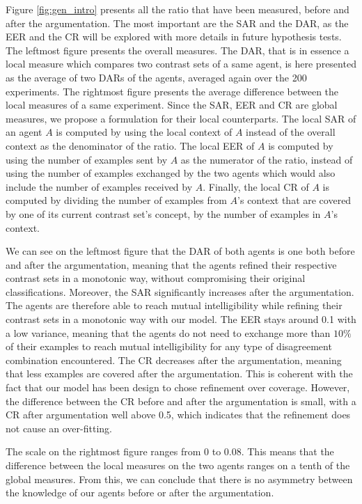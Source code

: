 Figure \ref{fig:gen_intro} presents all the ratio that have been measured, before and after the argumentation. The most important are the SAR and the DAR, as the EER and the CR will be explored with more details in  future hypothesis tests. The leftmost figure presents the overall measures. The DAR, that is in essence a local measure which compares two contrast sets of a same agent, is here presented as the average of two DARs of the agents, averaged again over the 200 experiments. The rightmost figure presents the average difference between the local measures of a same experiment. Since the SAR, EER and CR are global measures, we propose a formulation for their local counterparts. The local SAR of an agent $A$ is computed by using the local context of $A$ instead of the overall context as the denominator of the ratio. The local EER of $A$ is computed by using the number of examples sent by $A$ as the numerator of the ratio, instead of using the number of examples exchanged by the two agents which would also include the number of examples received by $A$. Finally, the local CR of $A$ is computed by dividing the number of examples from $A$'s context that are covered by one of its current contrast set's concept, by the number of examples in $A$'s context.

We can see on the leftmost figure that the DAR of both agents is one both before and after the argumentation, meaning that the agents refined their respective contrast sets in a monotonic way, without compromising their original classifications. Moreover, the SAR significantly increases after the argumentation. The agents are therefore able to reach mutual intelligibility while refining their contrast sets in a monotonic way with our model. The EER stays around 0.1 with a low variance, meaning that the agents do not need to exchange more than $10\%$ of their examples to reach mutual intelligibility for any type of disagreement combination encountered. The CR decreases after the argumentation, meaning that less examples are covered after the argumentation. This is coherent with the fact that our model has been design to chose refinement over coverage. However, the difference between the CR before and after the argumentation is small, with a CR after argumentation well above 0.5, which indicates that the refinement does not cause an over-fitting.

The scale on the rightmost figure ranges from 0 to 0.08. This means that the difference between the local measures on the two agents ranges on a tenth of the global measures. From this, we can conclude that there is no asymmetry between the knowledge of our agents before or after the argumentation.

